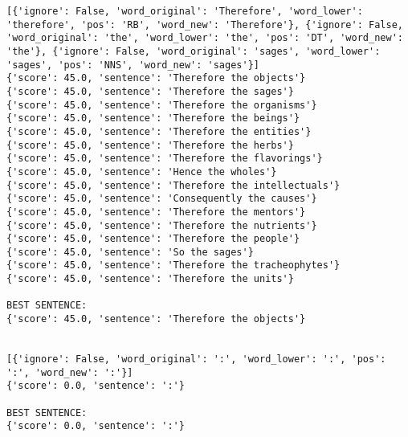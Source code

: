 \documentclass[12pt,a4paper,oneside]{book}
\begin{document}
\begin{verbatim}
[{'ignore': False, 'word_original': 'Therefore', 'word_lower': 'therefore', 'pos': 'RB', 'word_new': 'Therefore'}, {'ignore': False, 'word_original': 'the', 'word_lower': 'the', 'pos': 'DT', 'word_new': 'the'}, {'ignore': False, 'word_original': 'sages', 'word_lower': 'sages', 'pos': 'NNS', 'word_new': 'sages'}]
{'score': 45.0, 'sentence': 'Therefore the objects'}
{'score': 45.0, 'sentence': 'Therefore the sages'}
{'score': 45.0, 'sentence': 'Therefore the organisms'}
{'score': 45.0, 'sentence': 'Therefore the beings'}
{'score': 45.0, 'sentence': 'Therefore the entities'}
{'score': 45.0, 'sentence': 'Therefore the herbs'}
{'score': 45.0, 'sentence': 'Therefore the flavorings'}
{'score': 45.0, 'sentence': 'Hence the wholes'}
{'score': 45.0, 'sentence': 'Therefore the intellectuals'}
{'score': 45.0, 'sentence': 'Consequently the causes'}
{'score': 45.0, 'sentence': 'Therefore the mentors'}
{'score': 45.0, 'sentence': 'Therefore the nutrients'}
{'score': 45.0, 'sentence': 'Therefore the people'}
{'score': 45.0, 'sentence': 'So the sages'}
{'score': 45.0, 'sentence': 'Therefore the tracheophytes'}
{'score': 45.0, 'sentence': 'Therefore the units'}

BEST SENTENCE:
{'score': 45.0, 'sentence': 'Therefore the objects'}


[{'ignore': False, 'word_original': ':', 'word_lower': ':', 'pos': ':', 'word_new': ':'}]
{'score': 0.0, 'sentence': ':'}

BEST SENTENCE:
{'score': 0.0, 'sentence': ':'}



\end{verbatim}
\end{document}
